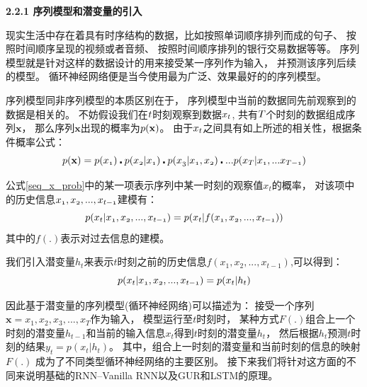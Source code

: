       \textbf{2.2.1 序列模型和潜变量的引入}

      现实生活中存在着具有时序结构的数据，比如按照单词顺序排列而成的句子、
      按照时间顺序呈现的视频或者音频、
      按照时间顺序排列的银行交易数据等等。
      序列模型就是针对这样的数据设计的用来接受某一序列作为输入，
      并预测该序列后续的模型。
      循环神经网络便是当今使用最为广泛、效果最好的的序列模型。

      序列模型同非序列模型的本质区别在于，
      序列模型中当前的数据同先前观察到的数据是相关的。
      不妨假设我们在$\mathnormal{t}$时刻观察到数据$\mathnormal{x_t}$,
      共有$\mathnormal{T}$个时刻的数据组成序列$\mathbf{x}$，
      那么序列$\mathbf{x}$出现的概率为$\mathnormal{p(\mathbf{x})}$。
      由于$\mathnormal{x_t}$之间具有如上所述的相关性，根据条件概率公式：
      \begin{equation} \label{seq_x_prob}
        \mathnormal{p(\mathbf{x})} = 
        \mathnormal{p(x_1)\centerdot p(x_2 | x_1) \centerdot 
        p(x_3 | x_1,x_2) \centerdot ... p(x_T| x_1,...x_{T-1}) }
      \end{equation}

      公式\ref{seq_x_prob}中的某一项表示序列中某一时刻的观察值$x_t$的概率，
      对该项中的历史信息$\mathnormal{x_1,x_2,...,x_{t-1}}$建模有：
      \begin{equation} \label{xt_prob_without_ht}
        \mathnormal{p(x_t | x_1, x_2, ..., x_{t-1})} = \mathnormal{
          p(x_t | f(x_1, x_2,...,x_{t-1}))
        }
      \end{equation}
      其中的$f(.)$表示对过去信息的建模。

      我们引入潜变量$h_t$来表示$t$时刻之前的历史信息$f(x_1, x_2,...,x_{t-1})$,可以得到：
      \begin{equation} \label{xt_prob_with_ht}
        \mathnormal{p(x_t | x_1, x_2, ..., x_{t-1})} = \mathnormal{
          p(x_t | h_t)
        }
      \end{equation}
      
      因此基于潜变量的序列模型(循环神经网络)可以描述为：
      接受一个序列$\mathbf{x} ={x_1, x_2, x_3,..., x_T}$作为输入，
      模型运行至$t$时刻时，
      某种方式$F(.)$组合上一个时刻的潜变量$h_{t-1}$和当前的输入信息$x_t$得到$t$时刻的潜变量$h_t$，
      然后根据$h_t$预测$t$时刻的结果$y_t = p(x_t | h_t)$。
      其中，组合上一时刻的潜变量和当前时刻的信息的映射$F(.)$
      成为了不同类型循环神经网络的主要区别。
      接下来我们将针对这方面的不同来说明基础的RNN--Vanilla RNN以及GUR和LSTM的原理。

